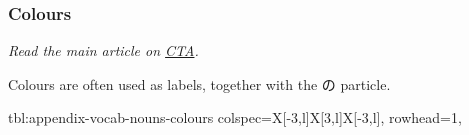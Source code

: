 \documentclass[../nihongo-gakushuu-kyouzai.tex]{subfiles}
\begin{document}
\subsubsection{Colours}
\emph{Read the main article on \href{https://cotoacademy.com/colors-japanese-use-japanese-color-words/}{CTA}.}

Colours are often used as labels, together with the の particle.

{tbl:appendix-vocab-nouns-colours}  %
{}  %
{
    colspec={X[-3,l]X[3,l]X[-3,l]},
    rowhead=1,
}  %
\end{document}
